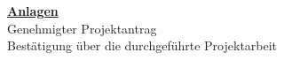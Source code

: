 \documentclass[11pt,a4paper]{article}
\begin{document}
\newpage
\appendix
\begin{titlepage}
  \vspace*{1cm}
  \begin{center}
    {\bfseries\Huge
      \underline{Anlagen}\\
    }
    \Large
    \vspace{5cm}
    Genehmigter Projektantrag \\
    Bestätigung über die durchgeführte Projektarbeit
    \vfill
  \end{center}
\end{titlepage}

\thispagestyle{empty}


\end{document}
